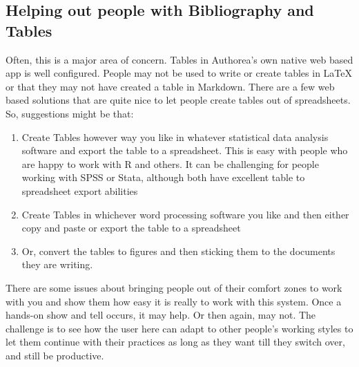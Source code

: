 \subsection{Helping out people with Bibliography and Tables}

Often, this is a major area of concern. Tables in Authorea’s own native web based app is well configured. People may not be used to write or create tables in LaTeX or that they may not have created a table in Markdown. There are a few web based solutions that are quite nice to let people create tables out of spreadsheets. So, suggestions might be that:

\begin{enumerate}
	
\item Create Tables however way you like in whatever statistical data analysis software and export the table to a spreadsheet. This is easy with people who are happy to work with R and others. It can be challenging for people working with SPSS or Stata, although both have excellent table to spreadsheet export abilities
\item Create Tables in whichever word processing software you like and then either copy and paste or export the table to a spreadsheet 
\item Or, convert the tables to figures and then sticking them to the documents they are writing. 
\end{enumerate}


There are some issues about bringing people out of their comfort zones to work with you and show them how easy it is really to work with this system. Once a hands-on show and tell occurs, it may help. Or then again, may not. The challenge is to see how the user here can adapt to other people's working styles to let them continue with their practices as long as they want till they switch over, and still be productive. 




    
    
    
    
